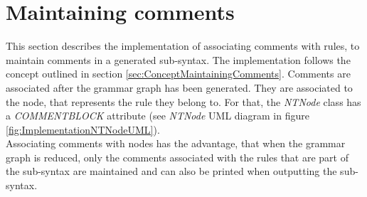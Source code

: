 \section{Maintaining comments}\label{sec:ImplementationMaintainingComments}
This section describes the implementation of associating comments with rules, to maintain comments in a generated sub-syntax.
The implementation follows the concept outlined in section \ref{sec:ConceptMaintainingComments}.
Comments are associated after the grammar graph has been generated.
They are associated to the node, that represents the rule they belong to.
For that, the \textit{NTNode} class has a \textit{COMMENT\textunderscore BLOCK} attribute (see \textit{NTNode} UML diagram in figure \ref{fig:ImplementationNTNodeUML}).\\
Associating comments with nodes has the advantage, that when the grammar graph is reduced, only the comments associated with the rules that are part of the sub-syntax are maintained and can also be printed when outputting the sub-syntax.\\

